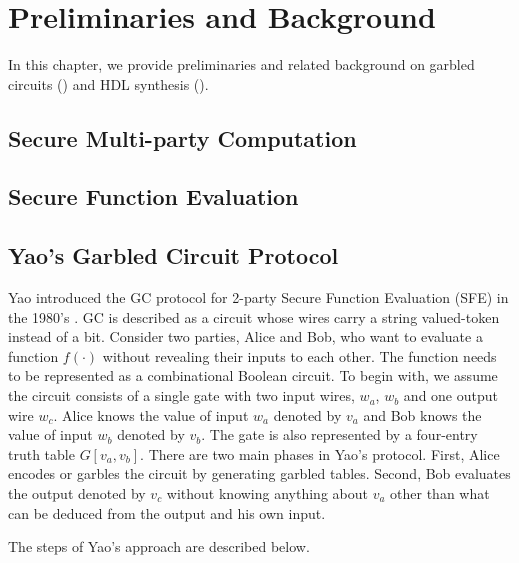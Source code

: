 \chapter{Preliminaries and Background}
In this chapter, we provide preliminaries and related background on garbled circuits () and HDL synthesis ().

\section{Secure Multi-party Computation}
\section{Secure Function Evaluation}
\section{Yao's Garbled Circuit Protocol}
Yao introduced the GC protocol for 2-party Secure Function Evaluation (SFE) in the 1980's \cite{yao1986generate}.
GC is described as a circuit whose wires carry a string valued-token instead of a bit.
Consider two parties, Alice and Bob, who want to evaluate a function $f(\cdot)$ without revealing their inputs to each other.
The function needs to be represented as a combinational Boolean circuit.
To begin with, we assume the circuit consists of a single gate with two input wires, $w_{a}$, $w_{b}$ and one output wire $w_{c}$.
Alice knows the value of input $w_{a}$ denoted by $v_{a}$ and Bob knows the value of input $w_{b}$ denoted by $v_{b}$.
The gate is also represented by a four-entry truth table $G[v_{a}, v_{b}]$.
There are two main phases in Yao's protocol.
First, Alice encodes or garbles the circuit by generating garbled tables.
Second, Bob evaluates the output denoted by $v_{c}$ without knowing anything about $v_{a}$ other than what can be deduced from the output and his own input.

The steps of Yao's approach are described below.

